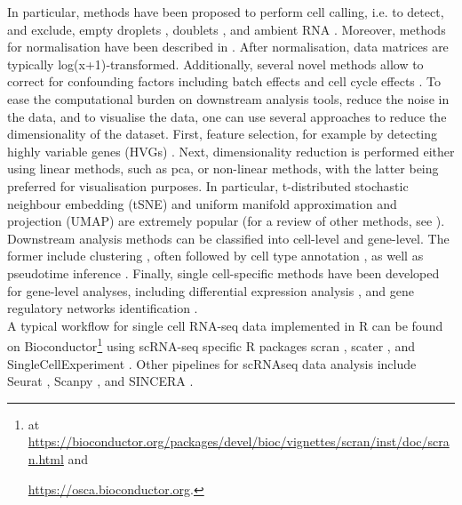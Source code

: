 In particular, methods have been proposed to perform  cell calling, i.e. to detect, and exclude, empty droplets \cite{lun2019emptydrops}, doublets \cite{wolock2019scrublet, mcginnis2019doubletfinder, depasquale2018doubletdecon}, and ambient RNA \cite{young2020soupx}.
Moreover, methods for normalisation have been described in \cite{lun2016pooling, vallejos2017normalizing, weinreb2018spring}.
After normalisation, data matrices are typically log(x+1)‐transformed. 
Additionally, several novel methods allow to correct for confounding factors including batch effects \cite{haghverdi2018batch, butler2018integrating, nowotschin2019emergent, stuart2019comprehensive, welch2019single, polanski2020bbknn} and cell cycle effects \cite{scialdone2015computational, mcdavid2016reply}.
To ease the computational burden on downstream analysis tools, reduce the noise in the data, and to visualise the data, one can use several approaches to reduce the dimensionality of the dataset.
First, feature selection, for example by detecting highly variable genes (HVGs) \cite{brennecke2013accounting, yip2019evaluation}.
Next, dimensionality reduction is performed either using linear methods, such as \gls{pca}, or non-linear methods, with the latter being preferred for visualisation purposes.
In particular, t-distributed stochastic neighbour embedding (tSNE)  \cite{maaten2008visualizing} and uniform manifold approximation and projection (UMAP) \cite{mcinnes2018umap} are extremely popular (for a review of other methods, see \cite{moon2018manifold}). 
Downstream analysis methods can be classified into cell-level and gene-level.
The former include clustering \cite{kiselev2017sc3, traag2019louvain}, often followed by cell type annotation \cite{kiselev2018scmap}, as well as pseudotime inference \cite{haghverdi2016diffusion, trapnell2014dynamics, bendall2014single, wolf2019paga}.
Finally, single cell-specific methods have been developed for gene-level analyses, including differential expression analysis \cite{finak16others}, and gene regulatory networks identification \cite{matsumoto2017scode, chan2017gene, aibar2017scenic}.\\

A typical workflow for single cell RNA-seq data implemented in R can be found on Bioconductor\footnote{at \url{https://bioconductor.org/packages/devel/bioc/vignettes/scran/inst/doc/scran.html} and

\url{https://osca.bioconductor.org}.} using scRNA-seq specific R packages scran \cite{lun2016step, risso2016scrnaseq}, scater \cite{mccarthy2017scater}, and SingleCellExperiment 
\cite{lun2019singlecellexperiment}.
Other pipelines for scRNAseq data analysis include 
Seurat \cite{butler2018integrating},
Scanpy \cite{wolf2018scanpy}, 
and SINCERA \cite{guo2015sincera}. 

